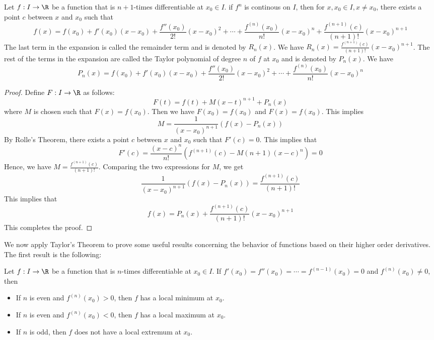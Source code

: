 \documentclass[openany]{book}
\begin{document}
\begin{mytheorem}
    Let $f: I \to \R$ be a function that is $n+1$-times differentiable at $x_0 \in I$. if $f^{n}$ is continous on $I$, then for $x, x_0 \in I, x \neq x_0$, there exists a point $c$ between $x$ and $x_0$ such that
    \[
        f(x) = f(x_0) + f'(x_0)(x - x_0) + \frac{f''(x_0)}{2!}(x - x_0)^2 + \cdots + \frac{f^{(n)}(x_0)}{n!}(x - x_0)^n + \frac{f^{(n+1)}(c)}{(n+1)!}(x - x_0)^{n+1}
    \]
    The last term in the expansion is called the remainder term and is denoted by $R_n(x)$. We have $R_n(x) = \frac{f^{(n+1)}(c)}{(n+1)!}(x - x_0)^{n+1}$.
    The rest of the terms in the expansion are called the Taylor polynomial of degree $n$ of $f$ at $x_0$ and is denoted by $P_n(x)$. We have
    \[
        P_n(x) = f(x_0) + f'(x_0)(x - x_0) + \frac{f''(x_0)}{2!}(x - x_0)^2 + \cdots + \frac{f^{(n)}(x_0)}{n!}(x - x_0)^n
    \]
\end{mytheorem}
\begin{proof}
    Define $F: I \to \R$ as follows:
    \[
        F(t) = f(t) + M(x - t)^{n+1} + P_n(x)
    \]
    where $M$ is chosen such that $F(x) = f(x_0)$. Then we have $F(x_0) = f(x_0)$ and $F(x) = f(x_0)$. 
    This implies 
    \[ M = \frac{1}{(x-x_0)^{n+1}} (f(x) - P_n(x)) \]
    By Rolle's Theorem, there exists a point $c$ between $x$ and $x_0$ such that $F'(c) = 0$. This implies that
    \[
        F'(c) = \frac{(x-c)^n}{n!} (f^{(n+1)}(c) - M(n+1)(x - c)^n) = 0
    \]
    Hence, we have $M = \frac{f^{(n+1)}(c)}{(n+1)!}$. 
    Comparing the two expressions for $M$, we get
    \[
        \frac{1}{(x-x_0)^{n+1}} (f(x) - P_n(x)) = \frac{f^{(n+1)}(c)}{(n+1)!}
    \]
    This implies that
    \[
        f(x) = P_n(x) + \frac{f^{(n+1)}(c)}{(n+1)!}(x - x_0)^{n+1}
    \]
    This completes the proof.
\end{proof}
We now apply Taylor's Theorem to prove some useful results concerning the behavior of functions based on their higher order derivatives. The first result is the following:
\begin{mytheorem}
    Let $f: I \to \R$ be a function that is $n$-times differentiable at $x_0 \in I$. If $f'(x_0) = f''(x_0) = \cdots = f^{(n-1)}(x_0) = 0$ and $f^{(n)}(x_0) \neq 0$, then
    \begin{itemize}
        \item If $n$ is even and $f^{(n)}(x_0) > 0$, then $f$ has a local minimum at $x_0$.
        \item If $n$ is even and $f^{(n)}(x_0) < 0$, then $f$ has a local maximum at $x_0$.
        \item If $n$ is odd, then $f$ does not have a local extremum at $x_0$.
    \end{itemize}
\end{mytheorem}
\end{document}
